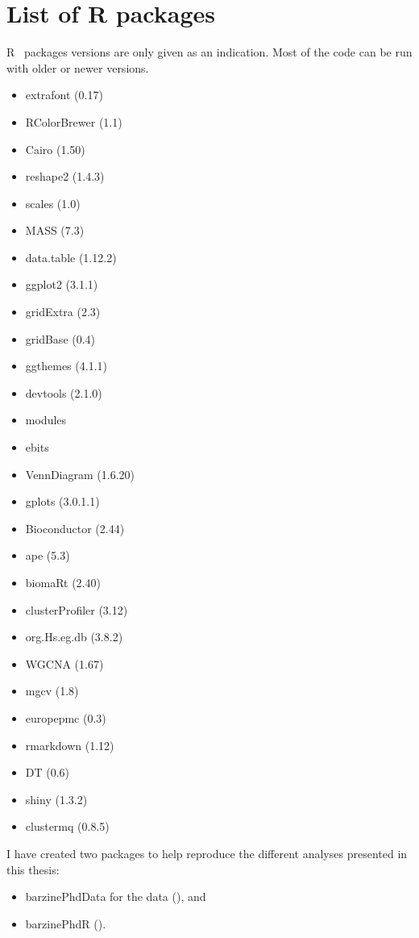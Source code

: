\chapter{List of R packages}\label{sec:Rpackages}

\textsf{R}~ packages versions are only given as an indication.
Most of the code can be run with older or newer versions.
{\small
\begin{multicols}{2}
    \begin{itemize}
    \item extrafont (0.17)~
    \item RColorBrewer (1.1)~
    \item Cairo (1.50)~
    \item reshape2 (1.4.3)~
    \item scales (1.0)~
    \item MASS (7.3)~
    \item data.table (1.12.2)~
    \item ggplot2 (3.1.1)~
    \item gridExtra (2.3)~
    \item gridBase (0.4)~
    \item ggthemes (4.1.1)~
    \item devtools (2.1.0)~
    \item modules~
    \item ebits~
    \item VennDiagram (1.6.20)~
    \item gplots (3.0.1.1)~
    \item Bioconductor (2.44)~
    \item ape (5.3)~
    \item biomaRt (2.40)~
    \item clusterProfiler (3.12)~
    \item org.Hs.eg.db (3.8.2)~
    \item WGCNA (1.67)~
    \item mgcv (1.8)~
    \item europepmc (0.3)~
    \item rmarkdown (1.12)~
    \item DT (0.6)~
    \item shiny (1.3.2)~
    \item clustermq (0.8.5)~
\end{itemize}
\end{multicols}
}

I have created two packages to help reproduce the different analyses
presented in this thesis:
\begin{itemize}
    \item barzinePhdData for the data (), and
    \item barzinePhdR ().
\end{itemize}
